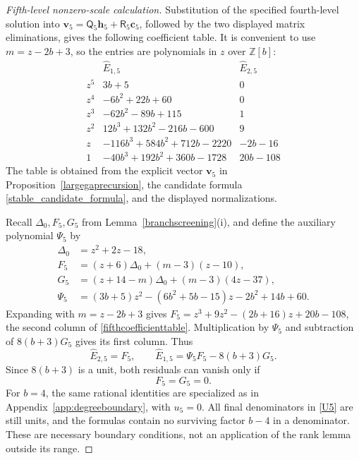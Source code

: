 \documentclass[10pt,a4paper]{amsart}
\begin{document}
\begin{proof}[Fifth-level nonzero-scale calculation]
Substitution of the specified fourth-level solution into
$\mathbf v_5=\mathsf Q_5\mathbf h_5+\mathsf R_5\mathbf c_5$,
followed by the two displayed matrix eliminations, gives the following
coefficient table.  It is convenient
to use $m=z-2b+3$, so the entries are polynomials in $z$ over
$\mathbb Z[b]$:
\begin{equation}\label{fifthcoefficienttable}
\begin{array}{c|l|l}
 &\widehat E_{1,5}&\widehat E_{2,5}\\ \hline
 z^5&3b+5&0\\
 z^4&-6b^2+22b+60&0\\
 z^3&-62b^2-89b+115&1\\
 z^2&12b^3+132b^2-216b-600&9\\
 z&-116b^3+584b^2+712b-2220&-2b-16\\
 1&-40b^3+192b^2+360b-1728&20b-108
\end{array}
\end{equation}
The table is obtained from the explicit vector $\mathbf v_5$ in
Proposition~\ref{largegaprecursion}, the candidate formula
\eqref{stable_candidate_formula}, and the displayed normalizations.

Recall $\Delta_0,F_5,G_5$ from
Lemma~\ref{branchscreening}(i), and define the auxiliary
polynomial $\Psi_5$ by
\begin{equation}\label{FGstruct}
\begin{aligned}
 \Delta_0&=z^2+2z-18,\\
 F_5&=(z+6)\Delta_0+(m-3)(z-10),\\
 G_5&=(z+14-m)\Delta_0+(m-3)(4z-37),\\
 \Psi_5&=(3b+5)z^2-(6b^2+5b-15)z-2b^2+14b+60.
\end{aligned}
\end{equation}
Expanding with $m=z-2b+3$ gives
$F_5=z^3+9z^2-(2b+16)z+20b-108$, the second column of
\eqref{fifthcoefficienttable}.  Multiplication by $\Psi_5$ and subtraction
of $8(b+3)G_5$ gives its first column.  Thus
\[
 \widehat E_{2,5}=F_5,\qquad \widehat E_{1,5}=\Psi_5F_5-8(b+3)G_5.
\]
Since $8(b+3)$ is a unit, both residuals can vanish only if
\begin{equation}\label{vfifthres}
 F_5=G_5=0.
\end{equation}
For $b=4$, the same rational identities are specialized as in
Appendix~\ref{app:degreeboundary}, with $u_5=0$.  All final denominators in
\eqref{U5} are still units, and the formulas contain no surviving factor
$b-4$ in a denominator.  These are necessary boundary conditions, not
an application of the rank lemma outside its range.


\end{proof}
\end{document}
